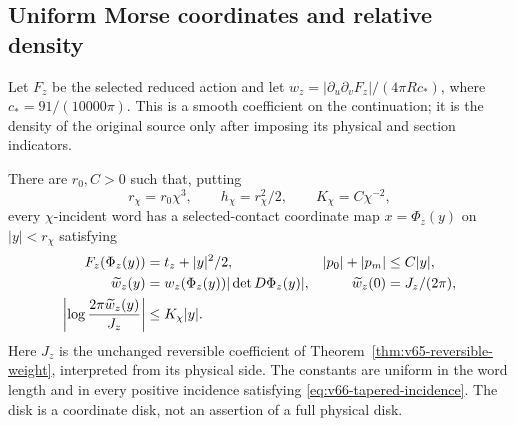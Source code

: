 \subsection{Uniform Morse coordinates and relative density}
Let $F_z$ be the selected reduced action and let
$w_z=|\partial_u\partial_vF_z|/(4\pi R c_*)$, where
$c_*=91/(10000\pi)$. This is a smooth coefficient on the continuation;
it is the density of the original source only after imposing its
physical and section indicators.

\begin{theorem}
\label{thm:v66-uniform-morse}
There are $r_0,C>0$ such that, putting
\begin{equation}\label{eq:v66-morse-budget}
 r_\chi=r_0\chi^3,\qquad h_\chi=r_\chi^2/2,
                 \qquad K_\chi=C\chi^{-2},
\end{equation}
every $\chi$-incident word has a selected-contact coordinate map
$x=\Phi_z(y)$ on $|y|<r_\chi$ satisfying
\begin{align}\label{eq:v66-uniform-morse}
 F_z(\Phi_z(y))&=t_z+|y|^2/2, &
 |p_0|+|p_m|&\le C|y|,\notag\\
 \widetilde w_z(y)&=w_z(\Phi_z(y))|\det D\Phi_z(y)|,&
 \widetilde w_z(0)&=J_z/(2\pi),\notag\\
 \left|\log\frac{2\pi\widetilde w_z(y)}{J_z}\right|
                    &\le K_\chi|y|.
\end{align}
Here $J_z$ is the unchanged reversible coefficient of
Theorem~\ref{thm:v65-reversible-weight}, interpreted from its physical
side. The constants are uniform in the word length and in every
positive incidence satisfying \eqref{eq:v66-tapered-incidence}.
The disk is a coordinate disk, not an assertion of a full physical disk.
\end{theorem}
